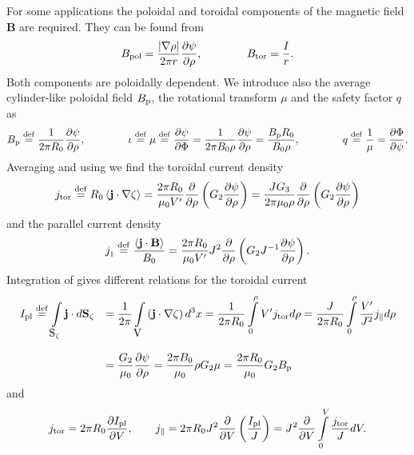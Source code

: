 For some applications the poloidal and toroidal components of the
magnetic field {\bf B} are required. They can be found from  
\begin{equation}
\label{Bpol}
B_{\rm pol}
=\frac{\left|\nabla\rho\right|}{2\pi r}\displaystyle{\partial \psi\over\partial \rho}
,\qquad\qquad
B_{\rm tor}=\frac{I}{r}
.\end{equation}
Both components are poloidally dependent. 
We introduce also the average cylinder-like poloidal field $B_{\rm p}$,
the rotational transform $\mu$ and the safety factor $q$ as 
\begin{equation}\label{dfmu}
B_{\rm p}
\stackrel{{\rm def}}{=}\frac{1}{2\pi R_0}\displaystyle{\partial \psi\over\partial \rho}
,\qquad\qquad
\iota\stackrel{{\rm def}}{=}\mu\stackrel{{\rm def}}{=}
\displaystyle{\partial \psi\over\partial \Phi}
=\frac{1}{2\pi B_0\rho}\displaystyle{\partial \psi\over\partial \rho}
=\frac{B_{\rm p} R_0}{B_0\rho}
,\qquad\qquad
q\stackrel{{\rm def}}{=}
\frac{1}{\mu}
=\displaystyle{\partial \Phi\over\partial \psi}
.\end{equation}
Averaging  and using  we find the toroidal current
density 
\begin{equation}
\label{dfjtor}
j_{\rm tor}
\stackrel{{\rm def}}{=} R_0\left<\bf j\cdot\nabla\zeta\right>
=\frac{2\pi R_0}{\mu_0 V'}\displaystyle{\partial \over\partial \rho}
\left(G_2\displaystyle{\partial \psi\over\partial \rho}\right)
=\frac{J G_3}{2\pi\mu_0\rho}\displaystyle{\partial \over\partial \rho}
\left(G_2\displaystyle{\partial \psi\over\partial \rho}\right)
\end{equation}
and the parallel current density
\begin{equation}\label{dfjp}\displaystyle
j_{\scriptscriptstyle\parallel}
\stackrel{{\rm def}}{=} \frac{\left<\bf j\cdot\bf B\right>}{B_0}
\displaystyle
=\frac{2\pi R_0}{\mu_0 V'}J^2
\displaystyle{\partial \over\partial \rho}
\left(G_2 J^{-1}\displaystyle{\partial \psi\over\partial \rho}\right)
.\end{equation}
Integration of  gives different relations for the toroidal
current 
\begin{equation}
\label{Ipl}
\begin{array}{rl}\dstyle
I_{\rm pl}
\df\int\limits_{\mbox{\msym S}_\zeta}{\bf j}\cdot d{\bf S}_\zeta
&\dstyle
=\frac{1}{2\pi}
\int\limits_{\mbox{\msym V}}\left({\bf j}\cdot\nabla\zeta\right) d^3x
=\frac{1}{2\pi R_0}\int\limits_0^\rho V' j_{\rm tor} d\rho
=\frac{J}{2\pi R_0}\int\limits_0^\rho \frac{V'}{J^2} j_\| d\rho
\bigskip \\ &\dstyle
=\frac{G_2}{\mu_0}\prti{\psi}{\rho}
=\frac{2\pi B_0}{\mu_0}\rho G_2\mu
=\frac{2\pi R_0}{\mu_0}G_2 B_{\rm p}
\end{array}
\end{equation}
and
\begin{equation}\label{jlon}
j_{\rm tor}
=2\pi R_0\displaystyle{\partial I_{\rm pl}\over\partial V}
,\qquad
j_\|
=2\pi R_0J^2\displaystyle{\partial \over\partial V}\left(\frac{I_{\rm pl}}{J}\right)
=J^2\displaystyle{\partial \over\partial V}\int\limits_0^V\frac{j_{\rm tor}}{J}dV
.\end{equation}
